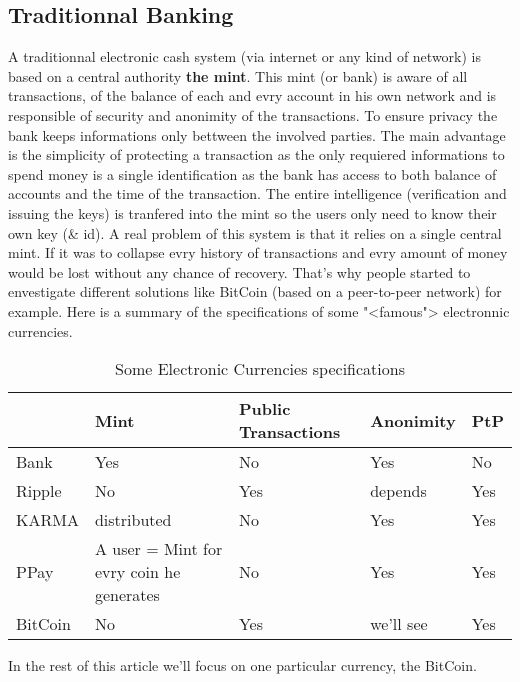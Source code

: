 \documentclass{acm_proc_article-sp}
\begin{document}
\subsection{Traditionnal Banking}
A traditionnal electronic cash system (via internet or any kind of network)
is based on a central authority \textbf{the mint}. 
This mint (or bank) is aware of all transactions, of the balance of each 
and evry account in his own network and is responsible of security and anonimity 
of the transactions. To ensure privacy the bank keeps informations only bettween
the involved parties. The main advantage is the simplicity of protecting a 
transaction as the only requiered informations to spend money is a single 
identification as the bank has access to both balance of accounts and the time of 
the transaction. The entire intelligence (verification and issuing the keys) is
tranfered into the mint so the users only need to know their own key (\& id).
A real problem of this system is that it relies on a single central mint. If it
was to collapse evry history of transactions and evry amount of money would be 
lost without any chance of recovery.
That's why people started to envestigate different solutions like BitCoin (based on a peer-to-peer network) for example. Here is a summary of the specifications of some "<famous"> electronnic currencies. 

\begin{table}[h]
\centering
\caption{Some Electronic Currencies specifications}
\begin{tabular}{|p{}|p{2cm}|p{}|p{}|p{1cm}|} \hline
&Mint &Public Transactions &Anonimity &PtP\\ \hline
Bank & Yes & No & Yes & No\\ \hline
Ripple & No & Yes & depends & Yes\\ \hline
KARMA & distributed & No & Yes & Yes\\ \hline 
PPay & A user = Mint for evry coin he generates & No & Yes & Yes\\ \hline
BitCoin & No & Yes & we'll see & Yes\\ \hline
\end{tabular}
\end{table}

In the rest of this article we'll focus on one particular currency, the BitCoin.
\end{document}
